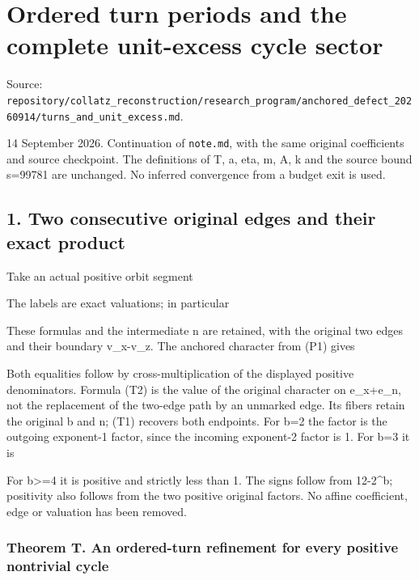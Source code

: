 \chapter{Ordered turn periods and the complete unit-excess cycle sector}
{\small\sffamily Source: \nolinkurl{repository/collatz_reconstruction/research_program/anchored_defect_20260914/turns_and_unit_excess.md}.\par}


14 September 2026. Continuation of \nolinkurl{note.md}, with the same
original coefficients and source checkpoint. The definitions of T, a,
eta, m, A, k and the source bound s=99781 are unchanged. No inferred
convergence from a budget exit is used.

\section{1. Two consecutive original edges and their exact product}

Take an actual positive orbit segment


The labels are exact valuations; in particular


These formulas and the intermediate n are retained, with the original
two edges and their boundary v\_x-v\_z. The anchored character from (P1)
gives


Both equalities follow by cross-multiplication of the displayed positive
denominators. Formula (T2) is the value of the original character on
e\_x+e\_n, not the replacement of the two-edge path by an unmarked edge.
Its fibers retain the original b and n; (T1) recovers both endpoints.
For b=2 the factor is the outgoing exponent-1 factor, since the incoming
exponent-2 factor is 1. For b=3 it is


For b\textgreater=4 it is positive and strictly less than 1. The signs
follow from 12-2\^{}b; positivity also follows from the two positive
original factors. No affine coefficient, edge or valuation has been
removed.

\subsection{Theorem T. An ordered-turn refinement for every positive
nontrivial cycle}

